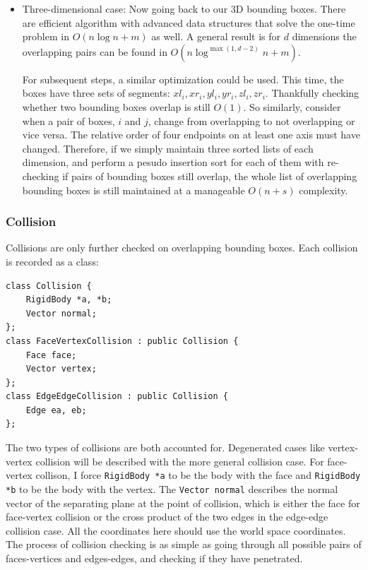 \documentclass[12pt,a4paper,twoside,openright]{report}
\newcommand{\code}{\texttt}
\begin{document}
\begin{itemize}
\item Three-dimensional case: Now going back to our 3D bounding boxes. There are efficient algorithm with advanced data structures that solve the one-time problem in $O(n\log n + m)$ as well. A general result is for $d$ dimensions the overlapping pairs can be found in $O(n \log ^ {\max(1, d - 2)} n + m)$.

For subsequent steps, a similar optimization could be used. This time, the boxes have three sets of segments: $xl_i, xr_i, yl_i, yr_i, zl_i, zr_i$. Thankfully checking whether two bounding boxes overlap is still $O(1)$. So similarly, consider when a pair of boxes, $i$ and $j$, change from overlapping to not overlapping or vice versa. The relative order of four endpoints on at least one axis must have changed. Therefore, if we simply maintain three sorted lists of each dimension, and perform a pesudo insertion sort for each of them with re-checking if pairs of bounding boxes still overlap, the whole list of overlapping bounding boxes is still maintained at a manageable $O(n + s)$ complexity.
\end{itemize}

\subsubsection{Collision}

Collisions are only further checked on overlapping bounding boxes. Each collision is recorded as a class:

\begin{verbatim}
class Collision {
    RigidBody *a, *b;
    Vector normal;
};
class FaceVertexCollision : public Collision {
    Face face;
    Vector vertex;
};
class EdgeEdgeCollision : public Collision {
    Edge ea, eb;
};
\end{verbatim}

The two types of collisions are both accounted for. Degenerated cases like vertex-vertex collision will be described with the more general collision case. For face-vertex collison, I force \code{RigidBody *a} to be the body with the face and \code{RigidBody *b} to be the body with the vertex. The \code{Vector normal} describes the normal vector of the separating plane at the point of collision, which is either the face for face-vertex collision or the cross product of the two edges in the edge-edge collision case. All the coordinates here should use the world space coordinates. The process of collision checking is as simple as going through all possible pairs of faces-vertices and edges-edges, and checking if they have penetrated. 
\end{document}

